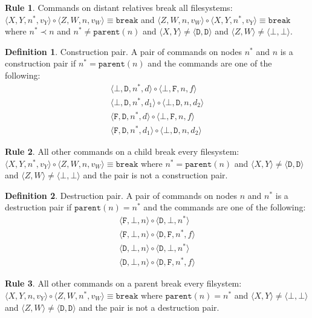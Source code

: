 \documentclass[12pt]{article}
\newcommand{\empt}{\bot}
\newcommand{\parent}{\mathtt{parent}}
\newcommand{\nn}{n^*} %
\newcommand{\cbrk}{\mathtt{break}} %
\newcommand{\ccharb}{\empt}
\newcommand{\ccharf}{\mathtt{F}}
\newcommand{\cchard}{\mathtt{D}}
\newcommand{\vald}{d} %
\newcommand{\valdi}{d_1}
\newcommand{\valdii}{d_2}
\newcommand{\valf}{f} %
\newcommand{\valvy}{v_Y} %
\newcommand{\valvw}{v_W}
\newcommand{\caa}[2]{\langle{#1,#2}\rangle}
\newcommand{\caaa}[3]{\langle{#1,#2,#3}\rangle}
\newcommand{\caaaa}[4]{\langle{#1,#2,#3,#4}\rangle}
\newcommand{\cbb}{\caa{\ccharb}{\ccharb}}
\newcommand{\cbfaa}[2]{\caaaa{\ccharb}{\ccharf}{#1}{#2}}
\newcommand{\cbdaa}[2]{\caaaa{\ccharb}{\cchard}{#1}{#2}}
\newcommand{\cfba}[1]{\caaa{\ccharf}{\ccharb}{#1}}
\newcommand{\cfdaa}[2]{\caaaa{\ccharf}{\cchard}{#1}{#2}}
\newcommand{\cdba}[1]{\caaa{\cchard}{\ccharb}{#1}}
\newcommand{\cdfaa}[2]{\caaaa{\cchard}{\ccharf}{#1}{#2}}
\newcommand{\cdd}{\caa{\cchard}{\cchard}}
\newcommand{\cxy}{\caa{X}{Y}}
\newcommand{\cxynv}{\caaaa{X}{Y}{n}{\valvy}}
\newcommand{\cxynnv}{\caaaa{X}{Y}{\nn}{\valvy}}
\newcommand{\czw}{\caa{Z}{W}}
\newcommand{\czwnv}{\caaaa{Z}{W}{n}{\valvw}}
\newcommand{\czwnnv}{\caaaa{Z}{W}{\nn}{\valvw}}
\newcommand{\cc}{\circ} %
\newcommand{\descendant}{\prec}
\theoremstyle{definition}
\newtheorem{mydef}{Definition}
\newtheorem{myax}{Rule}
\begin{document}
\begin{myax}\label{ax_distantrel_breaks}
Commands on distant relatives break all filesystems:
$\cxynnv\cc\czwnv \equiv \cbrk$
and $\czwnv\cc\cxynnv \equiv\cbrk$
where $\nn\descendant n$ and $\nn\neq\parent(n)$ and $\cxy\neq\cdd$ and $\czw\neq\cbb$.
\end{myax}

\begin{mydef}{Construction pair.}
A pair of commands on nodes $\nn$ and $n$ is a construction pair if $\nn=\parent(n)$ 
and the commands are one
of the following:
   \begin{gather*}
            \cbdaa{\nn}{\vald}\cc  \cbfaa{n}{\valf} \\
            \cbdaa{\nn}{\valdi}\cc  \cbdaa{n}{\valdii} \\
            \cfdaa{\nn}{\vald}\cc  \cbfaa{n}{\valf} \\
            \cfdaa{\nn}{\valdi}\cc  \cbdaa{n}{\valdii}
   \end{gather*}
\end{mydef}

\begin{myax}\label{ax_directchild_breaks}
All other commands on a child break every filesystem:
$\cxynnv\cc\czwnv \equiv \cbrk$ where $\nn=\parent(n)$ and $\cxy\neq\cdd$ and $\czw\neq\cbb$
and the pair is not a construction pair.
\end{myax}

\begin{mydef}{Destruction pair.}
A pair of commands on nodes $n$ and $\nn$ is a destruction pair if $\parent(n)=\nn$ and the commands are one
of the following:
   \begin{gather*}
            \cfba{n}\cc  \cdba{\nn} \\
            \cfba{n}\cc  \cdfaa{\nn}{\valf} \\
            \cdba{n}\cc  \cdba{\nn} \\
            \cdba{n}\cc  \cdfaa{\nn}{\valf}
   \end{gather*}
\end{mydef}

\begin{myax}\label{ax_directparent_breaks}
All other commands on a parent break every filsystem:
$\cxynv\cc\czwnnv \equiv \cbrk$ where $\parent(n)=\nn$ and $\cxy\neq\cbb$ and $\czw\neq\cdd$
and the pair is not a destruction pair.
\end{myax}
\end{document}
